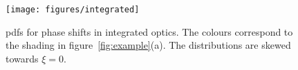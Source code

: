 \documentclass[aps,prl,twocolumn,floatfix]{revtex4}
\newcommand{\pdf}{{pdf}}
\begin{document}
\begin{figure}[b]
  \texttt{[image: figures/integrated]}
  \caption{\pdf{}s for phase shifts in integrated optics. The colours correspond
to the shading in figure~\ref{fig:example}(a). The distributions are skewed
towards \(\xi=0\).}
  \label{fig:integrated}
\end{figure}
\end{document}
